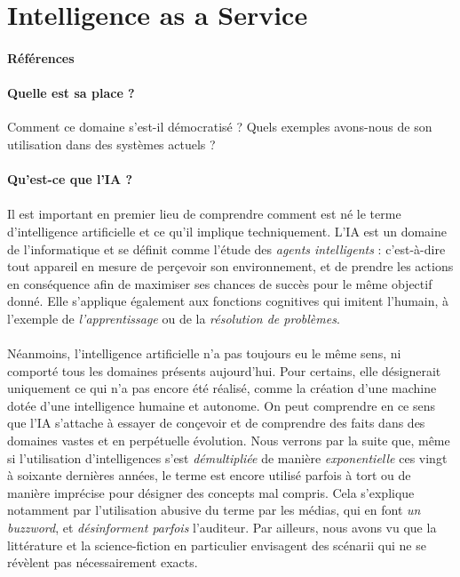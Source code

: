 \section{Intelligence as a Service}
\paragraph{Références} \cite{AI0} \cite{AI1}

\paragraph{Quelle est sa place ?} Comment ce domaine s'est-il démocratisé ? Quels exemples avons-nous
de son utilisation dans des systèmes actuels ?

\paragraph{Qu'est-ce que l'IA ?}

\paragraph{} Il est important en premier lieu de comprendre comment est né le terme d'intelligence
artificielle et ce qu'il implique techniquement. L'IA est un domaine de l'informatique et se définit
comme l'étude des \emph{agents intelligents} : c'est-à-dire tout appareil en mesure de perçevoir son
environnement, et de prendre les actions en conséquence afin de maximiser ses chances de succès pour
le même objectif donné. \cite{AI0} Elle s'applique également aux fonctions cognitives qui
imitent l'humain, à l'exemple de \emph{l'apprentissage} ou de la \emph{résolution de problèmes}.

\paragraph{} Néanmoins, l'intelligence artificielle n'a pas toujours eu le même sens, ni comporté
tous les domaines présents aujourd'hui. Pour certains, elle désignerait uniquement ce qui n'a
pas encore été réalisé, comme la création d'une machine dotée d'une intelligence humaine et autonome.
On peut comprendre en ce sens que l'IA s'attache à essayer de conçevoir et de comprendre des faits
dans des domaines vastes et en perpétuelle évolution. Nous verrons par la suite que, même si
l'utilisation d'intelligences s'est \emph{démultipliée} de manière \emph{exponentielle} ces vingt
à soixante dernières années, le terme est encore utilisé parfois à tort ou de manière imprécise 
pour désigner des concepts mal compris. Cela s'explique notamment par l'utilisation abusive du terme 
par les médias, qui en font \emph{un buzzword}, et \emph{désinforment parfois} l'auditeur.
Par ailleurs, nous avons vu que la littérature et la science-fiction en particulier envisagent des
scénarii qui ne se révèlent pas nécessairement exacts. 

